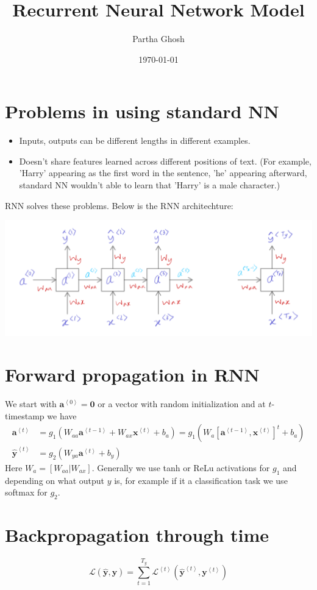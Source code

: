\documentclass[a4paper,11pt]{article}
\author{Partha Ghosh}
\date{\today}
\title{Recurrent Neural Network Model}
\newcommand{\bm}{\boldsymbol}
\renewcommand{\v}{\bm}
\newcommand{\h}{\hat}
\renewcommand{\.}{\cdot}
\newcommand{\op}{\left(}
\newcommand{\cp}{\right)}
\newcommand{\ip}[1]{\left\langle #1 \right\rangle}
\newcommand{\inp}[1]{\op #1 \cp}
\newcommand{\LL}{\mathcal{L}}
\begin{document}
\maketitle
\tableofcontents

\section{Problems in using standard NN}
\label{sec:org9907998}
\begin{itemize}
\item Inputs, outputs can be different lengths in different examples.
\item Doesn't share features learned across different positions of text. (For
example, 'Harry' appearing as the first word in the sentence, 'he'
appearing afterward, standard NN wouldn't able to learn that 'Harry' is
a male character.)
\end{itemize}

RNN solves these problems. Below is the RNN architechture:
\begin{center}
\includegraphics[width=.9\linewidth]{./img/rnn.png}
\end{center}
\section{Forward propagation in RNN}
\label{sec:org30e3fa2}
We start with \(\v a^{\ip{0}}=\v 0\) or a vector with random initialization and at \(t\)-timestamp we have
\begin{align*}
\v a^{\ip{t}}&=g_{1}(W_{aa}\v a^{\ip{t-1}}+W_{ax}\v x^{\ip{t}}+b_{a}) =
g_{1}(W_{a}[\v a^{\ip{t-1}}, \v x^{\ip{t}}]^{t}+b_{a})\\
\h{\v y}^{\ip{t}}&=g_{2}(W_{ya}\v a^{\ip{t}}+b_{y})
\end{align*}
Here \(W_{a}=[W_{aa}|W_{ax}]\).
Generally we use tanh or ReLu activations for \(g_{1}\) and depending on
what output \(y\) is, for example if it a classification task we use softmax
for \(g_{2}\). 
\section{Backpropagation through time}
\label{sec:orga2c808f}
\[\LL(\h{\v y},\v y) = \sum_{t=1}^{T_{y}}\LL^{\ip{t}}\inp{\h{\v y}^{\ip{t}},\v
      y^{\ip{t}}}\]
\end{document}
